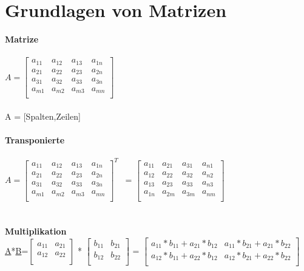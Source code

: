 \section{Grundlagen von Matrizen}
\textbf{Matrize} \\
\\
$A = 
\begin{bmatrix}
a_{11} & a_{12} & a_{13} & a_{1n} \\
a_{21} & a_{22}& a_{23} & a_{2n} \\
a_{31} & a_{32} & a_{33} & a_{3n} \\
a_{m1} & a_{m2} & a_{m3} & a_{mn} \\
\end{bmatrix}
$   
\\
\\
A = [Spalten,Zeilen]
\\
\\
\textbf{Transponierte} \\
\\
$A = 
\begin{bmatrix}
a_{11} & a_{12} & a_{13} & a_{1n} \\
a_{21} & a_{22}& a_{23} & a_{2n} \\
a_{31} & a_{32} & a_{33} & a_{3n} \\
a_{m1} & a_{m2} & a_{m3} & a_{mn} \\
\end{bmatrix}^T
$  
\
=
$\begin{bmatrix}
a_{11} & a_{21} & a_{31} & a_{n1} \\
a_{12} & a_{22} & a_{32} & a_{n2} \\
a_{13} & a_{23} & a_{33} & a_{n3} \\
a_{1n} & a_{2m} & a_{3m} & a_{nm} \\
\end{bmatrix}
$  
\\
\\
\\
\textbf{Multiplikation} \\
\underline{A}*\underline{B}=$\begin{bmatrix}
a_{11} & a_{21}  \\
a_{12} & a_{22}  \\
\end{bmatrix}$
*
$\begin{bmatrix}
b_{11} & b_{21}  \\
b_{12} & b_{22}  \\
\end{bmatrix}$
=
$\begin{bmatrix}
a_{11}*b_{11}+a_{21}*b_{12} & a_{11}*b_{21}+a_{21}*b_{22}  \\
a_{12}*b_{11}+a_{22}*b_{12} & a_{12}*b_{21}+a_{22}*b_{22}  \\
\end{bmatrix}$
